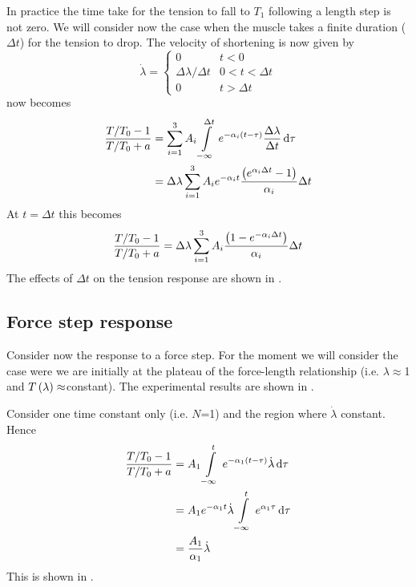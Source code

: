In practice the time take for the tension to fall to $T_{1}$ following a
length step is not zero. We will consider now the case when the muscle takes a
finite duration ($\Delta t$) for the tension to drop. The velocity of
shortening is now given by
\begin{equation*}
  \dot{\lambda}=\begin{cases} 
        0 & t < 0 \\
        \Delta\lambda/\Delta t & 0 < t < \Delta t \\
        0 & t > \Delta t
      \end{cases}
\end{equation*}
 now becomes
\begin{equation*}
  \begin{split}
    \dfrac{T/T_{0}-1}{T/T_{0}+a} &= \dsum_{i=1}^{3} A_{i}
    \gint{-\infty}{\Delta t}{e^{-\alpha_{i}\pbrac{t-\tau}}
      \dfrac{\Delta\lambda}{\Delta t}}{\tau} \\
    &=\Delta\lambda\dsum_{i=1}^{3}A_{i}e^{-\alpha_{i}t}\dfrac{\pbrac{
        e^{\alpha_{i}\Delta t}-1}}{\alpha_{i}}\Delta t
  \end{split}
\end{equation*}
At $t=\Delta t$ this becomes
\begin{equation}
  \dfrac{T/T_{0}-1}{T/T_{0}+a}=\Delta\lambda \displaystyle\sum _{i=1}^{3}A_{i}
  \dfrac{\left( 1-e^{-\alpha_{i}\Delta t} \right)}{\alpha_{i}}\Delta t
\end{equation}
The effects of $\Delta t$ on the tension response are shown in
.


\subsection{Force step response}
\enlargethispage{\baselineskip}
Consider now the response to a force step. For the moment we will consider the
case were we are initially at the plateau of the force-length relationship
(i.e. $\lambda\approx$1 and $ T\left( \lambda \right) \approx$constant). The
experimental results are shown in .


Consider one time constant only (i.e. $N$=1) and the region where
$\dot{\lambda}$ constant. Hence
\begin{equation}
  \begin{split}
    \dfrac{T/T_{0}-1}{T/T_{0}+a} &= A_{1}\gint{-\infty}{t}
    {e^{-\alpha_{1}\pbrac{t-\tau}}\dot{\lambda}}{\tau} \\
    &=A_{1}e^{-\alpha_{1}t}\dot{\lambda}\gint{-\infty}{t}
    {e^{\alpha_{1}\tau}}{\tau} \\
    &=\dfrac{A_{1}}{\alpha_{1}}\dot{\lambda}
  \end{split}
  \label{eqn:fmtransresponse1}
\end{equation}
This is shown in .

